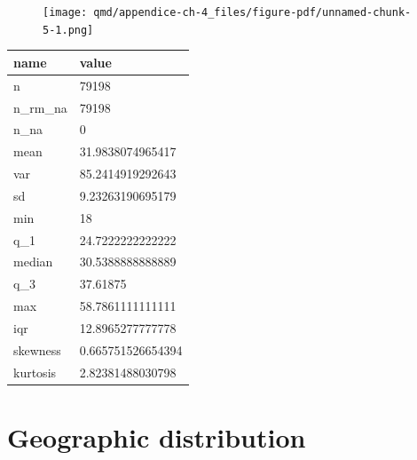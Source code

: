 \documentclass[
  12pt,
  a4paper,
  oneside]{tesesusp}
\newenvironment{Shaded}{\begin{snugshade}}{\end{snugshade}}
\newcommand{\FunctionTok}[1]{\textcolor[rgb]{0.28,0.35,0.67}{#1}}
\newcommand{\NormalTok}[1]{\textcolor[rgb]{0.00,0.23,0.31}{#1}}
\newcommand{\SpecialCharTok}[1]{\textcolor[rgb]{0.37,0.37,0.37}{#1}}
\begin{document}
\begin{figure}[H]

{\centering \texttt{[image: qmd/appendice-ch-4\_files/figure-pdf/unnamed-chunk-5-1.png]}

}

\end{figure}

\begin{Shaded}
\end{Shaded}

\begin{table}
\centering
\begin{tabular}{l|l}
\hline
name & value\\
\hline
n & 79198\\
\hline
n\_rm\_na & 79198\\
\hline
n\_na & 0\\
\hline
mean & 31.9838074965417\\
\hline
var & 85.2414919292643\\
\hline
sd & 9.23263190695179\\
\hline
min & 18\\
\hline
q\_1 & 24.7222222222222\\
\hline
median & 30.5388888888889\\
\hline
q\_3 & 37.61875\\
\hline
max & 58.7861111111111\\
\hline
iqr & 12.8965277777778\\
\hline
skewness & 0.665751526654394\\
\hline
kurtosis & 2.82381488030798\\
\hline
\end{tabular}
\end{table}

\hypertarget{geographic-distribution}{%
\section{Geographic distribution}\label{geographic-distribution}}
\end{document}
